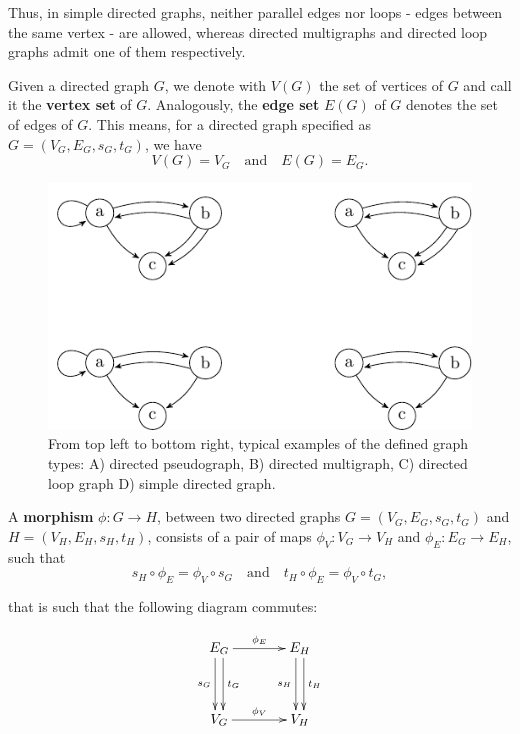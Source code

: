 Thus, in simple directed graphs, neither parallel edges nor loops - edges between the same vertex - are allowed, whereas directed multigraphs and directed loop graphs admit one of them respectively.


Given a directed graph $G$, we denote with $V(G)$ the set of vertices of $G$ and call it the \textbf{vertex set} of $G$. Analogously, the \textbf{edge set} $E(G)$ of $G$ denotes the set of edges of $G$. This means, for a directed graph specified as $G = (V_G,E_G,s_G,t_G)$, we have   \[V(G) = V_G \quad \mathrm{and} \quad E(G) = E_G.\] 


\begin{figure}
%
\includegraphics{gfx/tikz/directed_graph_types.pdf}
\caption{From top left to bottom right, typical examples of the defined graph types: A) directed pseudograph, B) directed multigraph, C) directed loop graph D) simple directed graph.} \label{fig:M1}
\end{figure}


A \textbf{morphism} $\phi: G \to H$, between two directed graphs $G=(V_G,E_G,s_G,t_G)$ and $H=(V_H,E_H,s_H,t_H)$, consists of a pair of maps $\phi_V: V_G \to V_H$ and $\phi_E: E_G \to E_H$, such that 
\[
s_H \circ \phi_E =  \phi_V \circ s_G \mathrm{\quad and \quad} t_H \circ \phi_E =  \phi_V \circ t_G,
\]

that is such that the following diagram commutes:

\begin{align*} 
\xymatrix@+=1.3cm{E_G \ar^{t_G}@<0.66ex>[d] \ar_{s_G}@<-0.66ex>[d] \ar^{\phi_E}[r] & E_H \ar^{t_H}@<0.66ex>[d] \ar_{s_H}@<-0.66ex>[d]\\ V_G \ar^{\phi_V}[r] & V_H}
\end{align*}

